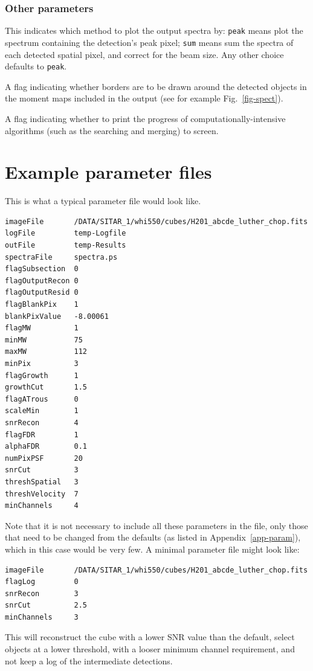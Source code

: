\documentclass[12pt,a4paper]{article}
\newcommand{\entrylabel}[1]{\mbox{\textsf{\bf{#1:}}}\hfil}
\newenvironment{entry}
        {\begin{list}{}%
                {\renewcommand{\makelabel}{\entrylabel}%
                        \setlength{\labelwidth}{30mm}%
                        \setlength{\labelsep}{5pt}%
                        \setlength{\itemsep}{2pt}%
                        \setlength{\parsep}{2pt}%
                        \setlength{\leftmargin}{35mm}%
                }%
        }%
{\end{list}}
\begin{document}
\subsubsection*{Other parameters}
\begin{entry}
\item[spectralMethod {\tt [peak]}] This indicates which method to plot
  the output spectra by: {\tt peak} means plot the spectrum containing
  the detection's peak pixel; {\tt sum} means sum the spectra of each
  detected spatial pixel, and correct for the beam size. Any other
  choice defaults to {\tt peak}.
\item[drawBorders {\tt [true]}] A flag indicating whether borders
  are to be drawn around the detected objects in the moment maps
  included in the output (see for example Fig.~\ref{fig-spect}).
\item[verbose {\tt [true]}] A flag indicating whether to print the
  progress of computationally-intensive algorithms (such as the
  searching and merging) to screen.
\end{entry}


\newpage
\section{Example parameter files}
\label{app-input}

This is what a typical parameter file would look like.

\begin{verbatim}
imageFile       /DATA/SITAR_1/whi550/cubes/H201_abcde_luther_chop.fits
logFile         temp-Logfile
outFile         temp-Results
spectraFile     spectra.ps
flagSubsection  0
flagOutputRecon 0
flagOutputResid 0
flagBlankPix    1
blankPixValue   -8.00061
flagMW          1
minMW           75
maxMW           112
minPix          3
flagGrowth      1
growthCut       1.5
flagATrous      0
scaleMin        1
snrRecon        4
flagFDR         1
alphaFDR        0.1
numPixPSF       20
snrCut          3
threshSpatial   3
threshVelocity  7
minChannels     4
\end{verbatim}

Note that it is not necessary to include all these parameters in the
file, only those that need to be changed from the defaults (as listed
in Appendix~\ref{app-param}), which in this case would be very few. A
minimal parameter file might look like:
\begin{verbatim}
imageFile       /DATA/SITAR_1/whi550/cubes/H201_abcde_luther_chop.fits
flagLog         0
snrRecon        3
snrCut          2.5
minChannels     3
\end{verbatim}
This will reconstruct the cube with a lower SNR value than the
default, select objects at a lower threshold,  with a looser minimum
channel requirement, and not keep a log of the intermediate
detections. 
\end{document}
